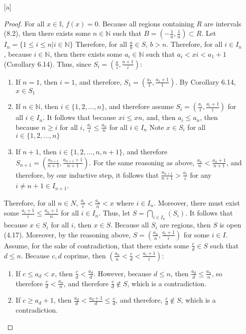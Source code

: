 \documentclass[openany, amssymb, psamsfonts]{amsart}
\newcommand{\bbI}{\mathbb{I}}
\newcommand{\bbN}{\mathbb{N}}
\theoremstyle{definition}
\numberwithin{equation}{section}
\begin{document}
\begin{enumerate} [a]
\begin{proof}
For all $x\in \bbI$, $f(x) = 0$. Because all regions containing $R$ are intervals (8.2), then there exists some $n\in \bbN$ such that $B=(-\frac{1}{n},\frac{1}{n}) \subset R$.
Let $I_n = \{1\leq i \leq n | i\in \bbN\}$
Therefore, for all $\frac{a}{b}\in S$, $b>n$. Therefore, for all $i\in I_n$, because $i\in \bbN$, then there exists some $a_i\in \bbN$ such that $a_i<xi<a_1+1$ (Corollary 6.14). Thus, since $S_i = (\frac{a}{i},\frac{a+1}{i})$: 
\begin{enumerate}
    \item If $n=1$, then $i=1$, and therefore, $S_1 = (\frac{a_1}{1}, \frac{a_1+1}{1})$. By Corollary 6.14, $x\in S_1$
    \item If $n\in \bbN$, then $i\in \{1,2,...,n\}$, and therefore assume $S_i = (\frac{a_i}{i}, \frac{a_i+1}{i})$ for all $i\in I_n$. It follows that because $xi\leq xn$, and, then $a_i\leq a_n$, then because $n\geq i$ for all $i$, $\frac{a_i}{i}\leq \frac{a_n}{n}$ for all $i\in I_n$ Note $x\in S_i$ for all $i\in \{1,2,...,n\}$
    \item If $n+1$, then $i\in \{1,2,...,n,n+1\}$, and therefore $S_{n+1} = (\frac{a_{n+1}}{n+1}, \frac{a_{n+1}+1}{n+1})$. For the same reasoning as above, $\frac{a_n}{n}<\frac{a_n+1}{n+1}$, and therefore, by our inductive step, it follows that $\frac{a_{n+1}}{n+1}>\frac{a_i}{i}$ for any $i\neq n+1 \in I_{n+1}$.
\end{enumerate}
Therefore, for all $n\in N$, $\frac{a_i}{i}<\frac{a_n}{n}<x$ where $i\in I_n$. Moreover, there must exist some $\frac{a_i+1}{i}\leq \frac{a_n+1}{n}$ for all $i\in I_n$. Thus, let $S = \bigcap_{i\in I_n}(S_i)$. It follows that because $x\in S_i$ for all $i$, then $x\in S$. Because all $S_i$ are regions, then $S$ is open (4.17). Moreover, by the reasoning above, $S = (\frac{a_n}{n}, \frac{a_i+1}{i})$ for some $i\in I$. 
Assume, for the sake of contradiction, that there exists some $\frac{c}{d}\in S$ such that $d\leq n$. Because $c,d$ coprime, then $(\frac{a_n}{n} < \frac{c}{d}< \frac{a_i+1}{i})$:
\begin{enumerate}
    \item If $c\leq a_d<x$, then $\frac{c}{d}< \frac{a_d}{d}$. However, because $d\leq n$, then $\frac{a_d}{d} \leq \frac{a_n}{n}$, so therefore $\frac{c}{d}<\frac{a_n}{n}$, and therefore $\frac{c}{d}\notin S$, which is a contradiction.
    \item If $c\geq a_d +1$, then $\frac{a_d}{d} < \frac{a_d+1}{d} \leq \frac{c}{d}$, and therefore, $\frac{c}{d} \notin S$, which is a contradiction. 
\end{enumerate}

\end{proof}
\end{enumerate}
\end{document}
